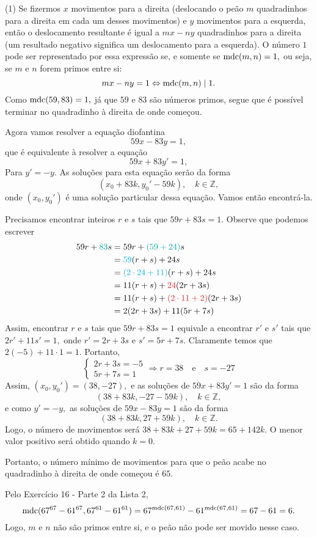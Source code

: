 \documentclass[12pt, a4paper]{article}
\newcommand{\mdc}{{\rm mdc}}
\newcommand{\negrito}[1]{\mbox{\boldmath{$#1$}}}
\newcommand{\itens}[1]{\begin{tasks}[label={(tsk[a])},label-width=3.6ex, label-format = {\bfseries}, column-sep = {0pt}](1) #1\end{tasks}}
\newcommand{\alt}[1]{\textcolor{Floresta}{$\negrito{(#1)} $}}
\begin{document}
\begin{solution}
\itens{
	\task[\alt{a}] Se fizermos $x$ movimentos para a direita (deslocando o peão $m$ quadradinhos para a direita em cada um desses movimentos) e $y$ movimentos para a esquerda, então o deslocamento resultante é igual a $mx -  ny$ quadradinhos para a direita (um resultado negativo significa um deslocamento para a esquerda). O número $1$ pode ser representado por essa expressão se, e somente se $\mdc(m,n) = 1,$ ou seja, se $m$ e $n$ forem primos entre si:
	\[
	mx - ny = 1 \Leftrightarrow \mdc(m,n) \mid 1.
	\]
	Como $\mdc(59,83)=1,$ já que $59$ e $83$ são números primos, segue que é possível terminar no quadradinho à direita de onde começou.
	
	Agora vamos resolver a equação diofantina
	\[
	59x - 83y = 1,
	\]
	que é equivalente à resolver a equação
	\[
	59x + 83y' = 1,
	\]
	Para $y' = -y.$
	As soluções para esta equação serão da forma 
	\[
	(x_0 + 83k, y_0' - 59k), \quad k \in \mathbb{Z},
	\]
	onde $(x_0, y_0')$ é uma solução particular dessa equação. Vamos então encontrá-la.
	
	Precisamos encontrar inteiros $r$ e $s$ tais que $59r + 83s = 1.$ Observe que podemos escrever
	\begin{align*}
	59r + \textcolor{Emerald}{83}s &= 59r + \textcolor{Emerald}{(59 + 24)}s \\&= \textcolor{Cyan}{59}(r+s) + 24s \\&= \textcolor{Cyan}{(2 \cdot 24 + 11)}(r+s) + 24s \\&= 11(r+s) + \textcolor{Red}{24}(2r+3s) \\&= 11(r+s) + \textcolor{Red}{(2 \cdot 11 + 2)}(2r+3s) \\&= 2(2r+3s) + 11(5r+7s)  
	\end{align*}
	Assim, encontrar $r$ e $s$ tais que $59r+83s = 1$ equivale a encontrar $r'$ e $s'$ tais que $2r'+11s' = 1,$ onde $r' = 2r+3s$ e $s' = 5r+7s.$ Claramente temos que $2(-5) + 11 \cdot 1 = 1.$ Portanto,
	\[
	\begin{cases}
	2r+3s = -5 \\
	5r+7s = 1
	\end{cases} \Rightarrow r = 38 \quad \mbox{e} \quad s = -27
	\]
	Assim, $(x_0, y_0') = (38,-27),$ e as soluções de $59x + 83y' = 1$ são da forma
	\[
	(38 + 83k, -27 - 59k), \quad k \in \mathbb{Z},
	\]
	e como $y' = -y,$ as soluções de $59x - 83y = 1$ são da forma
	\[
	(38 + 83k, 27 + 59k), \quad k \in \mathbb{Z}.
	\]
	Logo, o número de movimentos será $38 + 83k + 27 + 59k = 65 + 142k.$ O menor valor positivo será obtido quando $k = 0.$
	
	Portanto, o número mínimo de movimentos para que o peão acabe no quadradinho à direita de onde começou é $65.$
	
	\task[\alt{b}] Pelo Exercício 16 - Parte 2 da Lista 2,
	\[\mdc(67^{67} - 61^{67}, 67^{61} - 61^{61}) = 67^{\mdc(67,61)} - 61^{\mdc(67,61)} = 67 - 61 = 6.\]
	Logo, $m$ e $n$ não são primos entre si, e  o peão não pode ser movido nesse caso.
	}
\end{solution}
\end{document}
